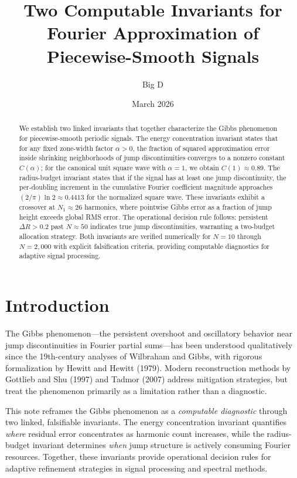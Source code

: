 \documentclass[11pt,letterpaper]{article}
\title{\textbf{Two Computable Invariants for Fourier Approximation of Piecewise-Smooth Signals}}
\author{Big D}
\date{March 2026}
\theoremstyle{remark}
\begin{document}
\maketitle

\begin{abstract}
We establish two linked invariants that together characterize the Gibbs phenomenon for piecewise-smooth periodic signals. The energy concentration invariant states that for any fixed zone-width factor $\alpha > 0$, the fraction of squared approximation error inside shrinking neighborhoods of jump discontinuities converges to a nonzero constant $C(\alpha)$; for the canonical unit square wave with $\alpha = 1$, we obtain $C(1) \approx 0.89$. The radius-budget invariant states that if the signal has at least one jump discontinuity, the per-doubling increment in the cumulative Fourier coefficient magnitude approaches $(2/\pi)\ln 2 \approx 0.4413$ for the normalized square wave. These invariants exhibit a crossover at $N_1 \approx 26$ harmonics, where pointwise Gibbs error as a fraction of jump height exceeds global RMS error. The operational decision rule follows: persistent $\Delta R > 0.2$ past $N \approx 50$ indicates true jump discontinuities, warranting a two-budget allocation strategy. Both invariants are verified numerically for $N = 10$ through $N = 2{,}000$ with explicit falsification criteria, providing computable diagnostics for adaptive signal processing.
\end{abstract}

\section{Introduction}

The Gibbs phenomenon---the persistent overshoot and oscillatory behavior near jump discontinuities in Fourier partial sums---has been understood qualitatively since the 19th-century analyses of Wilbraham and Gibbs, with rigorous formalization by Hewitt and Hewitt (1979). Modern reconstruction methods by Gottlieb and Shu (1997) and Tadmor (2007) address mitigation strategies, but treat the phenomenon primarily as a limitation rather than a diagnostic.

This note reframes the Gibbs phenomenon as a \emph{computable diagnostic} through two linked, falsifiable invariants. The energy concentration invariant quantifies \emph{where} residual error concentrates as harmonic count increases, while the radius-budget invariant determines \emph{when} jump structure is actively consuming Fourier resources. Together, these invariants provide operational decision rules for adaptive refinement strategies in signal processing and spectral methods.
\end{document}
